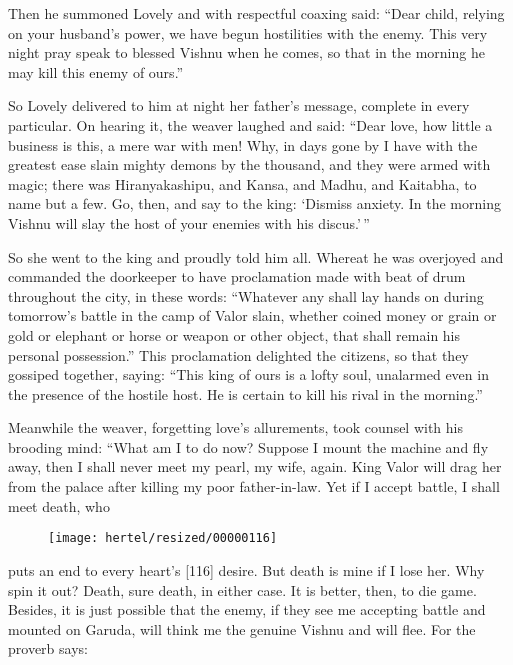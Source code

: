 \documentclass[article, twoside, 10pt]{memoir}
\begin{document}
Then he summoned Lovely and with respectful coaxing said:
``Dear child, relying on your husband's power, we have begun hostilities with the enemy. This very night pray speak to blessed Vishnu when he comes, so that in the morning he may kill this enemy of ours.''

So Lovely delivered to him at night her father's message, complete
in every particular. On hearing it, the weaver laughed and said:
``Dear love, how little a business is this, a mere war with men! Why, in days gone by I have with the greatest ease slain mighty demons by the thousand, and they were armed with magic; there was Hiranyakashipu, and Kansa, and Madhu, and Kaitabha, to name but a few. Go, then, and say to the king: `Dismiss anxiety. In the morning Vishnu will slay the host of your enemies with his discus.'\,''

So she went to the king and proudly told him all. Whereat he was
overjoyed and commanded the doorkeeper to have proclamation made
with beat of drum throughout the city, in these words:
``Whatever any shall lay hands on during tomorrow's battle in the camp of Valor slain, whether coined money or grain or gold or elephant or horse or weapon or other object, that shall remain his personal possession.''
This proclamation delighted the citizens, so that they gossiped
together, saying:
``This king of ours is a lofty soul, unalarmed even in the presence of the hostile host. He is certain to kill his rival in the morning.''

Meanwhile the weaver, forgetting love's allurements, took counsel
with his brooding mind: “What am I to do now? Suppose I mount the
machine and fly away, then I shall never meet my pearl, my wife,
again. King Valor will drag her from the palace after killing my
poor father-in-law. Yet if I accept battle, I shall meet death, who
\begin{figure}[p]\texttt{[image: hertel/resized/00000116]}\end{figure}puts an end to every heart's [116] desire. But death is mine if I
lose her. Why spin it out? Death, sure death, in either case. It is
better, then, to die game. Besides, it is just possible that the
enemy, if they see me accepting battle and mounted on Garuda, will
think me the genuine Vishnu and will flee. For the proverb says:
\end{document}
